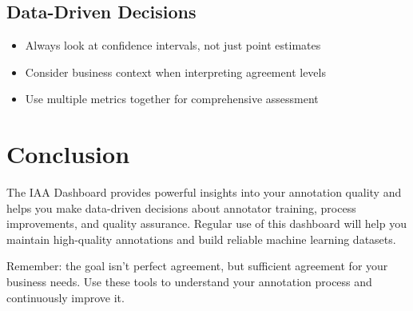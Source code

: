 \documentclass[11pt]{article}
\begin{document}
\subsection{Data-Driven Decisions}
\begin{itemize}
\item Always look at confidence intervals, not just point estimates
\item Consider business context when interpreting agreement levels
\item Use multiple metrics together for comprehensive assessment
\end{itemize}

\section{Conclusion}

The IAA Dashboard provides powerful insights into your annotation quality and helps you make data-driven decisions about annotator training, process improvements, and quality assurance. Regular use of this dashboard will help you maintain high-quality annotations and build reliable machine learning datasets.

Remember: the goal isn't perfect agreement, but sufficient agreement for your business needs. Use these tools to understand your annotation process and continuously improve it.
\end{document}
